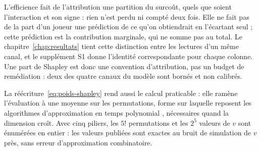 L'efficience fait de l'attribution une partition du surcoût, quels que soient l'interaction et son
signe : rien n'est perdu ni compté deux fois. Elle ne fait pas de la part d'un joueur une
prédiction de ce qu'on obtiendrait en l'écartant seul ; cette prédiction est la contribution
marginale, qui ne somme pas au total. Le chapitre~\ref{chap:resultats} tient cette distinction
entre les lectures d'un même canal, et le supplément S1 donne l'identité correspondante pour
chaque colonne. Une part de Shapley est donc une convention d'attribution, pas un budget de
remédiation : deux des quatre canaux du modèle sont bornés et non calibrés.

La réécriture~\eqref{eq:poids-shapley} rend aussi le calcul praticable : elle ramène l'évaluation à
une moyenne sur les permutations, forme sur laquelle reposent les algorithmes d'approximation en
temps polynomial \citep{CastroGomezTejada2009, SongNelsonStaum2016}, nécessaires quand la dimension
croît. Avec cinq piliers, les $5!$ permutations et les $2^5$ valeurs de $v$ sont énumérées en
entier : les valeurs publiées sont exactes au bruit de simulation de $v$ près, sans erreur
d'approximation combinatoire.
